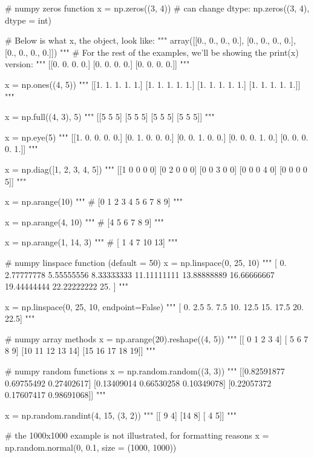 \begin{python}
	# numpy zeros function
	x = np.zeros((3, 4))
	# can change dtype: np.zeros((3, 4), dtype = int)
	
	# Below is what x, the object, look like:
	"""
	array([[0., 0., 0., 0.],
	[0., 0., 0., 0.],
	[0., 0., 0., 0.]])
	"""
	# For the rest of the examples, we'll be showing the print(x) version:
	"""
	[[0. 0. 0. 0.]
	[0. 0. 0. 0.]
	[0. 0. 0. 0.]]
	"""
	
	x = np.ones((4, 5))
	"""
	[[1. 1. 1. 1. 1.]
	[1. 1. 1. 1. 1.]
	[1. 1. 1. 1. 1.]
	[1. 1. 1. 1. 1.]]
	"""
	
	x = np.full((4, 3), 5)
	"""
	[[5 5 5]
	[5 5 5]
	[5 5 5]
	[5 5 5]]
	"""
	
	x = np.eye(5)
	"""
	[[1. 0. 0. 0. 0.]
	[0. 1. 0. 0. 0.]
	[0. 0. 1. 0. 0.]
	[0. 0. 0. 1. 0.]
	[0. 0. 0. 0. 1.]]
	"""
	
	x = np.diag([1, 2, 3, 4, 5])
	"""
	[[1 0 0 0 0]
	[0 2 0 0 0]
	[0 0 3 0 0]
	[0 0 0 4 0]
	[0 0 0 0 5]]
	"""
	
	x = np.arange(10)
	"""
	# [0 1 2 3 4 5 6 7 8 9]
	"""
	
	x = np.arange(4, 10)
	"""
	# [4 5 6 7 8 9]
	"""
	
	x = np.arange(1, 14, 3)
	"""
	# [ 1  4  7 10 13]
	"""
	
	# numpy linspace function (default = 50)
	x = np.linspace(0, 25, 10)
	"""
	[ 0.          2.77777778  5.55555556  8.33333333 11.11111111 13.88888889
	16.66666667 19.44444444 22.22222222 25.        ]
	"""
	
	x = np.linspace(0, 25, 10, endpoint=False)
	"""
	[ 0.   2.5  5.   7.5 10.  12.5 15.  17.5 20.  22.5]
	"""
	
	# numpy array methods
	x = np.arange(20).reshape((4, 5))
	"""
	[[ 0  1  2  3  4]
	[ 5  6  7  8  9]
	[10 11 12 13 14]
	[15 16 17 18 19]]
	"""
	
	# numpy random functions
	x = np.random.random((3, 3))
	"""
	[[0.82591877 0.69755492 0.27402617]
	[0.13409014 0.66530258 0.10349078]
	[0.22057372 0.17607417 0.98691068]]
	"""
	
	x = np.random.randint(4, 15, (3, 2))
	"""
	[[ 9  4]
	[14  8]
	[ 4  5]]
	"""
	
	# the 1000x1000 example is not illustrated, for formatting reasons
	x = np.random.normal(0, 0.1, size = (1000, 1000))
\end{python}








